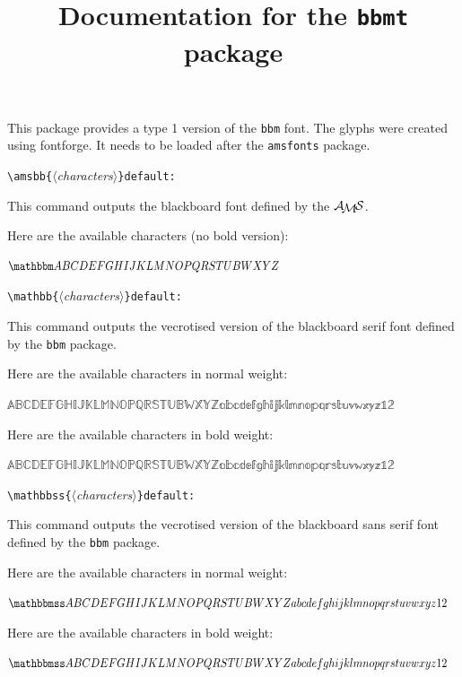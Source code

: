 \documentclass[12pt, babellanguage=british, titlespace]{altarticle}
\title{Documentation for the \texttt{bbmt} package}
\date{}
\newcommand{\argt}[1]{\texttt{\{}\ensuremath{\langle}\textrm{{\emph{#1}}}\ensuremath{\rangle}\texttt{\}}}
\newcommand{\commandline}[1][]{\def\argI{#1}\ccommandline}
\newcommand{\ccommandline}[2][]{\par\medskip\hspace*{-.75cm}\texttt{\textbackslash#2}\argI{}\hfill\if\relax\detokenize{#1}\relax\else\texttt{default:~#1}\fi\par}
\begin{document}
\maketitle
This package provides a type 1 version of the \texttt{bbm} font. The glyphs were created using fontforge. It needs to be loaded after the \texttt{amsfonts} package.

\medskip

\commandline[\argt{characters}]{amsbb}This command outputs the blackboard font defined by the \ensuremath{\mathcal{A}\kern-.1667em\lower.5ex\hbox{\ensuremath{\mathcal{M}}}\kern-.125em\mathcal{S}}.

Here are the available characters (no bold version):

$\amsbb{ABCDEFGHIJKLMNOPQRSTUBWXYZ}$
\commandline[\argt{characters}]{mathbb}This command outputs the vecrotised version of the blackboard serif font defined by the \texttt{bbm} package.

Here are the available characters in normal weight:

$\mathbb{ABCDEFGHIJKLMNOPQRSTUBWXYZabcdefghijklmnopqrstuvwxyz12}$

Here are the available characters in bold weight:

{\boldmath$\mathbb{ABCDEFGHIJKLMNOPQRSTUBWXYZabcdefghijklmnopqrstuvwxyz12}$}
\commandline[\argt{characters}]{mathbbss}This command outputs the vecrotised version of the blackboard sans serif font defined by the \texttt{bbm} package.

Here are the available characters in normal weight:

$\mathbbss{ABCDEFGHIJKLMNOPQRSTUBWXYZabcdefghijklmnopqrstuvwxyz12}$

Here are the available characters in bold weight:

{\boldmath$\mathbbss{ABCDEFGHIJKLMNOPQRSTUBWXYZabcdefghijklmnopqrstuvwxyz12}$}
\end{document}
